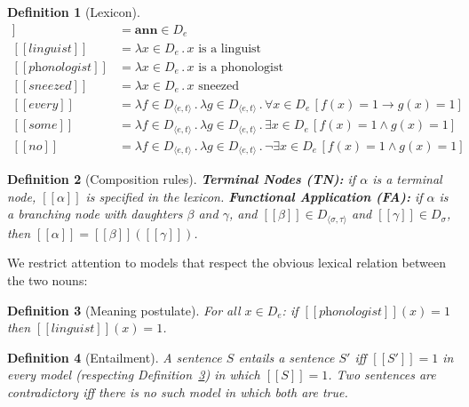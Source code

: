 \documentclass{article}
\newtheorem{definition}{Definition}
\newcommand{\sem}[1]{[\![#1]\!]}
\newcommand{\lam}[1]{\lambda #1 \,.\,}
\begin{document}
\begin{definition}[Lexicon]\label{def:lexicon}
\begin{align*}
  \sem{\textit{Ann}} &= \mathbf{ann} \in D_e\\
  \sem{\textit{linguist}} &= \lam{x \in D_e} x \text{ is a linguist}\\
  \sem{\textit{phonologist}} &= \lam{x \in D_e} x \text{ is a phonologist}\\
  \sem{\textit{sneezed}} &= \lam{x \in D_e} x \text{ sneezed}\\
  \sem{\textit{every}} &= \lam{f \in D_{\langle e,t\rangle}} \lam{g \in D_{\langle e,t\rangle}} \forall x \in D_e\,[f(x) = 1 \rightarrow g(x) = 1]\\
  \sem{\textit{some}} &= \lam{f \in D_{\langle e,t\rangle}} \lam{g \in D_{\langle e,t\rangle}} \exists x \in D_e\,[f(x) = 1 \wedge g(x) = 1]\\
  \sem{\textit{no}} &= \lam{f \in D_{\langle e,t\rangle}} \lam{g \in D_{\langle e,t\rangle}} \neg\exists x \in D_e\,[f(x) = 1 \wedge g(x) = 1]
\end{align*}
\end{definition}

\begin{definition}[Composition rules]\label{def:rules}
\textbf{Terminal Nodes (TN):} if $\alpha$ is a terminal node, $\sem{\alpha}$
is specified in the lexicon. \textbf{Functional Application (FA):} if
$\alpha$ is a branching node with daughters $\beta$ and $\gamma$, and
$\sem{\beta} \in D_{\langle\sigma,\tau\rangle}$ and $\sem{\gamma} \in
D_\sigma$, then $\sem{\alpha} = \sem{\beta}(\sem{\gamma})$.
\end{definition}

We restrict attention to models that respect the obvious lexical relation
between the two nouns:

\begin{definition}[Meaning postulate]\label{def:mp}
For all $x \in D_e$: if $\sem{\textit{phonologist}}(x) = 1$ then
$\sem{\textit{linguist}}(x) = 1$.
\end{definition}

\begin{definition}[Entailment]\label{def:entail}
A sentence $S$ \emph{entails} a sentence $S'$ iff $\sem{S'} = 1$ in every
model (respecting Definition~\ref{def:mp}) in which $\sem{S} = 1$. Two
sentences are \emph{contradictory} iff there is no such model in which both
are true.
\end{definition}
\end{document}
